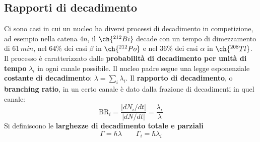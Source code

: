 \subsection{Rapporti di decadimento}
Ci sono casi in cui un nucleo ha diversi processi di decadimento in competizione, ad esempio nella catena $4n$, il $\ch{^{212}Bi}$ decade con un tempo di dimezzamento di $61\, min$, nel $64\%$ dei casi $\beta$ in $\ch{^{212}Po}$ e nel $36\%$ dei casi $\alpha$ in $\ch{^{208}Tl}$. Il processo è caratterizzato dalle \textbf{probabilità di decadimento per unità di tempo} $\lambda_i$ in ogni canale possibile. Il nucleo padre segue una legge esponenziale \textbf{costante di decadimento}: $\lambda=\sum_i\lambda_i$. Il \textbf{rapporto di decadimento}, o \textbf{branching ratio}, in un certo canale è dato dalla frazione di decadimenti in quel canale:
\begin{equation*}
    \text{BR}_i=\frac{|dN_i/dt|}{|dN/dt|}=\frac{\lambda_i}{\lambda}
\end{equation*}
Si definiscono le \textbf{larghezze di decadimento totale e parziali}
\begin{equation*}
    \Gamma=\hbar\lambda \qquad \Gamma_i=\hbar\lambda_i
\end{equation*}
